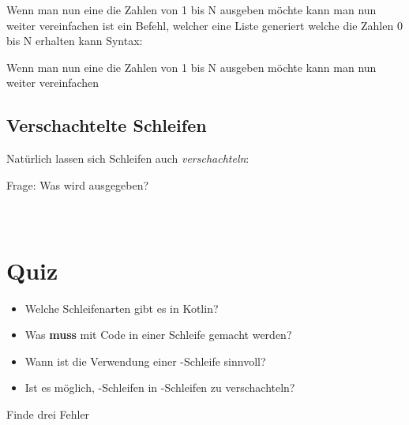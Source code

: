 \livecoding

\begin{frame}
    \slidehead
    Wenn man nun eine die Zahlen von 1 bis N ausgeben möchte kann man nun weiter vereinfachen
     ist ein Befehl, welcher eine Liste generiert welche die Zahlen 0 bis N erhalten kann
    Syntax: 
\end{frame}

\begin{frame}
    \slidehead
    Wenn man nun eine die Zahlen von 1 bis N ausgeben möchte kann man nun weiter vereinfachen
\end{frame}

\subsection{Verschachtelte Schleifen}
\begin{frame}
    \slidehead

    Natürlich lassen sich Schleifen auch \textit{verschachteln}:

    \pause
    \begin{block}{Frage: Was wird ausgegeben?}\pause
        \\
        \\
        \\
    \end{block}
\end{frame}

\livecoding

\section{Quiz}
\begin{frame}
    \slidehead
    \pause
    \begin{itemize}
        \item Welche Schleifenarten gibt es in Kotlin?\pause
        \item Was \textbf{muss} mit Code in einer Schleife gemacht werden?\pause
        \item Wann ist die Verwendung einer -Schleife sinnvoll?\pause
        \item Ist es möglich, -Schleifen in -Schleifen zu verschachteln?\pause
    \end{itemize}
    \begin{block}{Finde drei Fehler}
    \end{block}
\end{frame}

